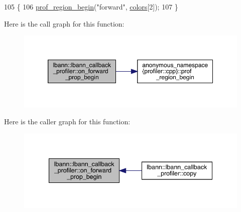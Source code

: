 \begin{DoxyCode}
105                                                             \{
106   \hyperlink{namespaceanonymous__namespace_02profiler_8cpp_03_ad2ea0278cd1f25dc30ddd76194ace64b}{prof\_region\_begin}(\textcolor{stringliteral}{"forward"}, \hyperlink{classlbann_1_1lbann__callback__profiler_addf3323ce665956dc4988e3850bceb30}{colors}[2]);
107 \}
\end{DoxyCode}
Here is the call graph for this function\+:\nopagebreak
\begin{figure}[H]
\begin{center}
\leavevmode
\includegraphics[width=350pt]{classlbann_1_1lbann__callback__profiler_a027fe89a27c52ae80a1982f96dd62455_cgraph}
\end{center}
\end{figure}
Here is the caller graph for this function\+:\nopagebreak
\begin{figure}[H]
\begin{center}
\leavevmode
\includegraphics[width=340pt]{classlbann_1_1lbann__callback__profiler_a027fe89a27c52ae80a1982f96dd62455_icgraph}
\end{center}
\end{figure}
\mbox{\label{classlbann_1_1lbann__callback__profiler_adc7cf77381bec8ab1cc5ba5e554ec268}} 
